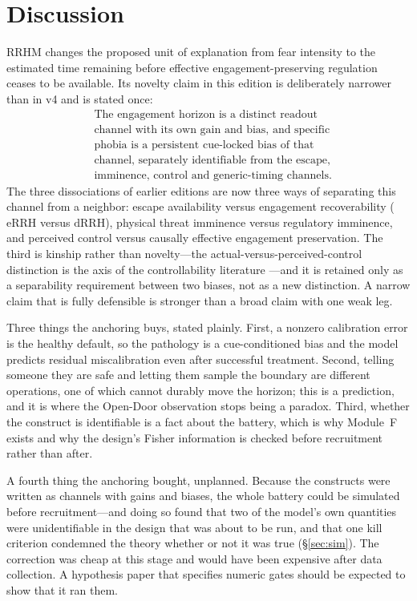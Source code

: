 \documentclass[9pt,twocolumn]{article}
\newcommand{\eRRH}{\mathrm{eRRH}}
\newcommand{\dRRH}{\mathrm{dRRH}}
\begin{document}
\section{Discussion}
RRHM changes the proposed unit of explanation from fear intensity to the estimated time remaining before effective engagement-preserving regulation ceases to be available. Its novelty claim in this edition is deliberately narrower than in v4 and is stated once:
\[
\boxed{
\begin{aligned}
&\text{The engagement horizon is a distinct readout}\\[-0.1em]
&\text{channel with its own gain and bias, and specific}\\[-0.1em]
&\text{phobia is a persistent cue-locked bias of that}\\[-0.1em]
&\text{channel, separately identifiable from the escape,}\\[-0.1em]
&\text{imminence, control and generic-timing channels.}
\end{aligned}}
\]
The three dissociations of earlier editions are now three ways of separating this channel from a neighbor: escape availability versus engagement recoverability ($\eRRH$ versus $\dRRH$), physical threat imminence versus regulatory imminence, and perceived control versus causally effective engagement preservation. The third is kinship rather than novelty---the actual-versus-perceived-control distinction is the axis of the controllability literature \cite{maier2016}---and it is retained only as a separability requirement between two biases, not as a new distinction. A narrow claim that is fully defensible is stronger than a broad claim with one weak leg.

Three things the anchoring buys, stated plainly. First, a nonzero calibration error is the healthy default, so the pathology is a cue-conditioned bias and the model predicts residual miscalibration even after successful treatment. Second, telling someone they are safe and letting them sample the boundary are different operations, one of which cannot durably move the horizon; this is a prediction, and it is where the Open-Door observation stops being a paradox. Third, whether the construct is identifiable is a fact about the battery, which is why Module~F exists and why the design's Fisher information is checked before recruitment rather than after.

A fourth thing the anchoring bought, unplanned. Because the constructs were written as channels with gains and biases, the whole battery could be simulated before recruitment---and doing so found that two of the model's own quantities were unidentifiable in the design that was about to be run, and that one kill criterion condemned the theory whether or not it was true (\S\ref{sec:sim}). The correction was cheap at this stage and would have been expensive after data collection. A hypothesis paper that specifies numeric gates should be expected to show that it ran them.
\end{document}
